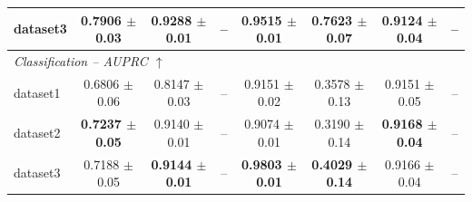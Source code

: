 \begin{table}[p]
{\begin{tabular}{lccccccc}
dataset3
& \textbf{0.7906 $\pm$ 0.03}
& \textbf{0.9288 $\pm$ 0.01}
& --
& \textbf{0.9515 $\pm$ 0.01}
& \textbf{0.7623 $\pm$ 0.07}
& \textbf{0.9124 $\pm$ 0.04}
& -- \\
\midrule
\multicolumn{8}{l}{\textit{Classification -- AUPRC $\uparrow$}} \\
\midrule
dataset1
& 0.6806 $\pm$ 0.06
& 0.8147 $\pm$ 0.03
& --
& 0.9151 $\pm$ 0.02
& 0.3578 $\pm$ 0.13
& 0.9151 $\pm$ 0.05
& -- \\
dataset2
& \textbf{0.7237 $\pm$ 0.05}
& 0.9140 $\pm$ 0.01
& --
& 0.9074 $\pm$ 0.01
& 0.3190 $\pm$ 0.14
& \textbf{0.9168 $\pm$ 0.04}
& -- \\
dataset3
& 0.7188 $\pm$ 0.05
& \textbf{0.9144 $\pm$ 0.01}
& --
& \textbf{0.9803 $\pm$ 0.01}
& \textbf{0.4029 $\pm$ 0.14}
& 0.9166 $\pm$ 0.04
& -- \\
\bottomrule
\end{tabular}%
}
\end{table}
